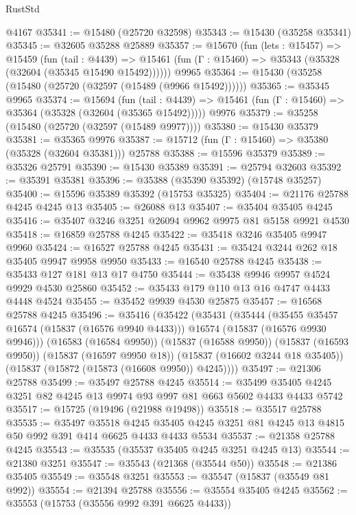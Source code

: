 \begin{lexlean}{RustStd}
\begin{coremodule}
{\begin{coremodule}
{{{{{{{{{{{{{{{{{{{{{{{{{{{{{{{{{{{{{{{{{{{{{{{{{{{{{{{{{{{{    @4167
@35341 := @15480 (@25720 @32598)
@35343 := @15430 (@35258 @35341)
@35345 := @32605 @35288 @25889
@35357 := @15670
    (fun (lets : @15457) =>
    @15459
      (fun (tail : @4439) =>
      @15461 (fun (Γ : @15460) => @35343 (@35328 (@32604 (@35345 @15490 @15492))))))
    @9965
@35364 := @15430 (@35258 (@15480 (@25720 (@32597 (@15489 (@9966 @15492))))))
@35365 := @35345 @9965
@35374 := @15694
    (fun (tail : @4439) => @15461 (fun (Γ : @15460) => @35364 (@35328 (@32604 (@35365 @15492)))))
    @9976
@35379 := @35258 (@15480 (@25720 (@32597 (@15489 @9977))))
@35380 := @15430 @35379
@35381 := @35365 @9976
@35387 := @15712 (fun (Γ : @15460) => @35380 (@35328 (@32604 @35381))) @25788
@35388 := @15596 @35379
@35389 := @35326 @25791
@35390 := @15430 @35389
@35391 := @25794 @32603
@35392 := @35391 @35381
@35396 := @35388 (@35390 @35392) (@15748 @35257)
@35400 := @15596 @35389 @35392 (@15753 @35325)
@35404 := @21176 @25788 @4245 @4245 @13
@35405 := @26088 @13
@35407 := @35404 @35405 @4245
@35416 := @35407 @3246 @3251 @26094 @9962 @9975 @81 @5158 @9921 @4530
@35418 := @16859 @25788 @4245
@35422 := @35418 @3246 @35405 @9947 @9960
@35424 := @16527 @25788 @4245
@35431 := @35424 @3244 @262 @18 @35405 @9947 @9958 @9950
@35433 := @16540 @25788 @4245
@35438 := @35433 @127 @181 @13 @17 @4750
@35444 := @35438 @9946 @9957 @4524 @9929 @4530 @25860
@35452 := @35433 @179 @110 @13 @16 @4747 @4433 @4448 @4524
@35455 := @35452 @9939 @4530 @25875
@35457 := @16568 @25788 @4245
@35496 := @35416
    (@35422
      (@35431
        (@35444
          (@35455 @35457 @16574 (@15837 (@16576 @9940 @4433)))
          @16574
          (@15837 (@16576 @9930 @9946)))
        (@16583 (@16584 @9950))
        (@15837 (@16588 @9950))
        (@15837 (@16593 @9950))
        (@15837 (@16597 @9950 @18))
        (@15837 (@16602 @3244 @18 @35405))
        (@15837 (@15872 (@15873 (@16608 @9950)) @4245))))
@35497 := @21306 @25788
@35499 := @35497 @25788 @4245
@35514 := @35499 @35405 @4245 @3251 @82 @4245 @13 @9974 @93 @997 @81 @663 @5602 @4433 @4433 @5742
@35517 := @15725 (@19496 (@21988 @19498))
@35518 := @35517 @25788
@35535 := @35497
    @35518
    @4245
    @35405
    @4245
    @3251
    @81
    @4245
    @13
    @4815
    @50
    @992
    @391
    @414
    @6625
    @4433
    @4433
    @5534
@35537 := @21358 @25788 @4245
@35543 := @35535 (@35537 @35405 @4245 @3251 @4245 @13)
@35544 := @21380 @3251
@35547 := @35543 (@21368 (@35544 @50))
@35548 := @21386 @35405
@35549 := @35548 @3251
@35553 := @35547 (@15837 (@35549 @81 @992))
@35554 := @21394 @25788
@35556 := @35554 @35405 @4245
@35562 := @35553 (@15753 (@35556 @992 @391 @6625 @4433))
}}}}}}}}}}}}}}}}}}}}}}}}}}}}}}}}}}}}}}}}}}}}}}}}}}}}}}}}}}}}
\end{coremodule}}
\end{coremodule}
\end{lexlean}
